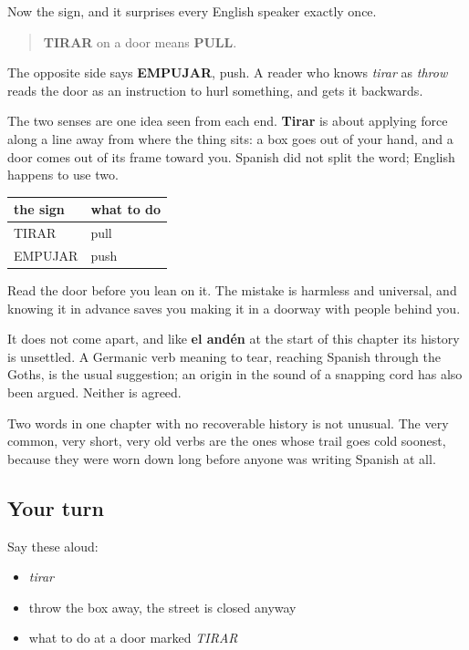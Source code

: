 \begin{culture}
Now the sign, and it surprises every English speaker exactly once.

\begin{quote}
\textbf{TIRAR} on a door means \textbf{PULL}.
\end{quote}

The opposite side says \textbf{EMPUJAR}, push. A reader who knows \emph{tirar} as \emph{throw} reads the door as an instruction to hurl something, and gets it backwards.

The two senses are one idea seen from each end. \textbf{Tirar} is about applying force along a line away from where the thing sits: a box goes out of your hand, and a door comes out of its frame toward you. Spanish did not split the word; English happens to use two.

\noindent
\begin{tabularx}{\linewidth}{@{}>{\raggedright\arraybackslash}X>{\raggedright\arraybackslash}X@{}}
\toprule
\textbf{the sign} & \textbf{what to do} \\
\midrule
TIRAR & pull \\
EMPUJAR & push \\
\bottomrule
\end{tabularx}

Read the door before you lean on it. The mistake is harmless and universal, and knowing it in advance saves you making it in a doorway with people behind you.
\end{culture}

\begin{cousinweb}
It does not come apart, and like \textbf{el andén} at the start of this chapter its history is unsettled. A Germanic verb meaning to tear, reaching Spanish through the Goths, is the usual suggestion; an origin in the sound of a snapping cord has also been argued. Neither is agreed.

Two words in one chapter with no recoverable history is not unusual. The very common, very short, very old verbs are the ones whose trail goes cold soonest, because they were worn down long before anyone was writing Spanish at all.
\end{cousinweb}

\subsection*{Your turn}
Say these aloud:

\begin{itemize}
\raggedright
  \item \emph{tirar}
  \item throw the box away, the street is closed anyway
  \item what to do at a door marked \emph{TIRAR}
\end{itemize}

